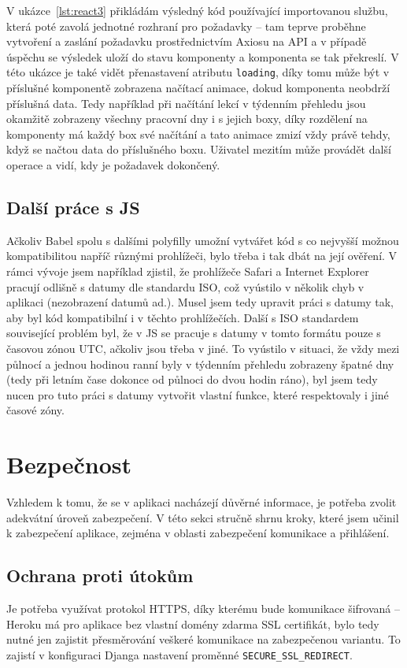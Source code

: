     V ukázce~\ref{lst:react3} přikládám výsledný kód používající importovanou službu, která poté zavolá jednotné rozhraní pro požadavky -- tam teprve proběhne vytvoření a zaslání požadavku prostřednictvím Axiosu na API a v případě úspěchu se výsledek uloží do stavu komponenty a komponenta se tak překreslí. V této ukázce je také vidět přenastavení atributu \verb|loading|, díky tomu může být v příslušné komponentě zobrazena načítací animace, dokud komponenta neobdrží příslušná data. Tedy například při načítání lekcí v týdenním přehledu jsou okamžitě zobrazeny všechny pracovní dny i s jejich boxy, díky rozdělení na komponenty má každý box své načítání a tato animace zmizí vždy právě tehdy, když se načtou data do příslušného boxu. Uživatel mezitím může provádět další operace a vidí, kdy je požadavek dokončený.
    
    \subsection{Další práce s JS}
    Ačkoliv Babel spolu s dalšími polyfilly umožní vytvářet kód s co nejvyšší možnou kompatibilitou napříč různými prohlížeči, bylo třeba i tak dbát na její ověření. V rámci vývoje jsem například zjistil, že prohlížeče Safari a Internet Explorer pracují odlišně s datumy dle standardu ISO, což vyústilo v několik chyb v aplikaci (nezobrazení datumů ad.). Musel jsem tedy upravit práci s datumy tak, aby byl kód kompatibilní i v těchto prohlížečích. Další s ISO standardem související problém byl, že v JS se pracuje s datumy v tomto formátu pouze s časovou zónou UTC, ačkoliv jsou třeba v jiné. To vyústilo v situaci, že vždy mezi půlnocí a jednou hodinou ranní byly v týdenním přehledu zobrazeny špatné dny (tedy při letním čase dokonce od půlnoci do dvou hodin ráno), byl jsem tedy nucen pro tuto práci s datumy vytvořit vlastní funkce, které respektovaly i jiné časové zóny.
    
    \section{Bezpečnost}\label{sec:bezpecnost}
    Vzhledem k tomu, že se v aplikaci nacházejí důvěrné informace, je potřeba zvolit adekvátní úroveň zabezpečení. V této sekci stručně shrnu kroky, které jsem učinil k zabezpečení aplikace, zejména v oblasti zabezpečení komunikace a přihlášení.
    
    \subsection{Ochrana proti útokům}\label{sec:bezpecnostOchrana}
    Je potřeba využívat protokol HTTPS, díky kterému bude komunikace šifrovaná -- Heroku má pro aplikace bez vlastní domény zdarma SSL certifikát, bylo tedy nutné jen zajistit přesměrování veškeré komunikace na zabezpečenou variantu. To zajistí v konfiguraci Djanga nastavení proměnné \verb|SECURE_SSL_REDIRECT|.
    
